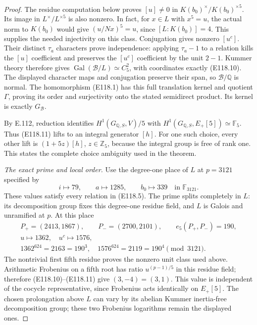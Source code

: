 \begin{proof}
The residue computation below proves $[u]\ne0$ in
$K(b_0)^\times/K(b_0)^{\times5}$. Its image in
$L^\times/L^{\times5}$ is also nonzero. In fact, for
$x\in L$ with $x^5=u$, the actual norm to $K(b_0)$
would give $(u/Nx)^5=u$, since $[L:K(b_0)]=4$.
This supplies the needed injectivity on this class.
Conjugation gives nonzero $[u^c]$. Their distinct
$\tau_a$ characters prove independence: applying
$\tau_a-1$ to a relation kills the $[u]$ coefficient
and preserves the $[u^c]$ coefficient by the unit
$2-1$. Kummer theory therefore gives
$\operatorname{Gal}(\mathcal B/L)\simeq C_5^2$,
with coordinates exactly (E118.10).
The displayed character maps and conjugation preserve
their span, so $\mathcal B/\mathbb Q$ is normal.
The homomorphism (E118.1) has this full translation
kernel and quotient $\Gamma$, proving its order and
surjectivity onto the stated semidirect product. Its
kernel is exactly $G_{\mathcal B}$.

By E.112, reduction identifies
$H^1(G_{\mathbb Q,S},V)/5$ with
$H^1(G_{\mathbb Q,S},E_+[5])\simeq\mathbb F_5$.
Thus (E118.11) lifts to an integral generator $[h]$.
For one such choice, every other lift is
$(1+5z)[h]$, $z\in\mathbb Z_5$, because the integral
group is free of rank one. This states the complete
choice ambiguity used in the theorem.

\emph{The exact prime and local order.}
Use the degree-one place of $L$ at $p=3121$ specified by
\[
 i\longmapsto79,\qquad a\longmapsto1285,\qquad
 b_0\longmapsto339\quad\text{in }\mathbb F_{3121}.
\]
These values satisfy every relation in (E118.5).
The prime splits completely in $L$: its decomposition
group fixes this degree-one residue field, and $L$
is Galois and unramified at $p$. At this place
\[
 \begin{gathered}
 P_+=(2413,1867),\qquad P_-=(2700,2101),\qquad
 e_5(P_+,P_-)=190,\\
 u\longmapsto1362,\quad u^c\longmapsto1576,\\
 1362^{624}=2163=190^3,\quad
 1576^{624}=2119=190^4\pmod{3121}.
 \end{gathered}
 \tag{E118.12}
\]
The nontrivial first fifth residue proves the nonzero
unit class used above. Arithmetic Frobenius on a fifth
root has ratio $u^{(p-1)/5}$ in this residue field;
therefore (E118.10)--(E118.11) give $(3,-4)=(3,1)$.
This value is independent of the cocycle representative,
since Frobenius acts identically on $E_+[5]$.
The chosen prolongation above $L$ can vary by its
abelian Kummer inertia-free decomposition group;
these two Frobenius logarithms remain the displayed ones.


\end{proof}
